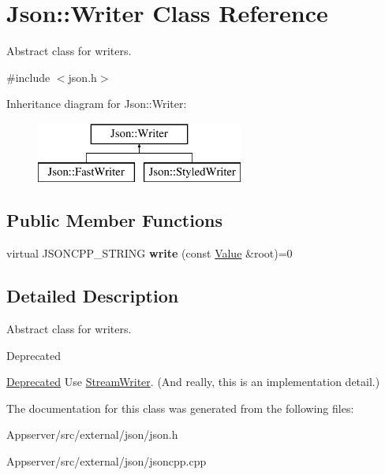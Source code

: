 \hypertarget{classJson_1_1Writer}{}\section{Json\+:\+:Writer Class Reference}
\label{classJson_1_1Writer}


Abstract class for writers.  




{\ttfamily \#include $<$json.\+h$>$}

Inheritance diagram for Json\+:\+:Writer\+:\begin{figure}[H]
\begin{center}
\leavevmode
\includegraphics[height=2.000000cm]{classJson_1_1Writer}
\end{center}
\end{figure}
\subsection*{Public Member Functions}
\begin{DoxyCompactItemize}
\item 
virtual J\+S\+O\+N\+C\+P\+P\+\_\+\+S\+T\+R\+I\+NG {\bfseries write} (const \hyperlink{classJson_1_1Value}{Value} \&root)=0\hypertarget{classJson_1_1Writer_a61c55882b82c7651d0b9b683c6d3f371}{}\label{classJson_1_1Writer_a61c55882b82c7651d0b9b683c6d3f371}

\end{DoxyCompactItemize}


\subsection{Detailed Description}
Abstract class for writers. 

\begin{DoxyRefDesc}{Deprecated}
\item[\hyperlink{deprecated__deprecated000007}{Deprecated}]Use \hyperlink{classJson_1_1StreamWriter}{Stream\+Writer}. (And really, this is an implementation detail.) \end{DoxyRefDesc}


The documentation for this class was generated from the following files\+:\begin{DoxyCompactItemize}
\item 
Appserver/src/external/json/json.\+h\item 
Appserver/src/external/json/jsoncpp.\+cpp\end{DoxyCompactItemize}
